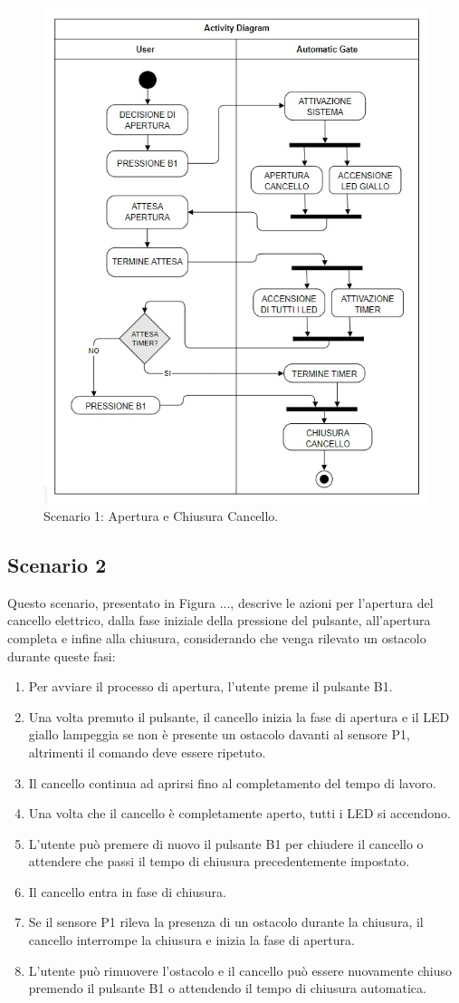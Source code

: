 \documentclass[12pt]{article}
\begin{document}
\begin{figure}[h]
    \centering
    \includegraphics[width = 0.7 \textwidth ]{Scenario_1.jpg}
    \caption{Scenario 1: Apertura e Chiusura Cancello.}
    
\end{figure}

\subsection{Scenario 2}
Questo scenario, presentato in Figura ..., descrive le azioni per l’apertura del cancello elettrico, dalla fase iniziale della pressione del pulsante, all’apertura completa e infine alla chiusura, considerando che venga rilevato un ostacolo durante queste fasi:
\begin{enumerate}
    \item Per avviare il processo di apertura, l’utente preme il pulsante B1.
    \item Una volta premuto il pulsante, il cancello inizia la fase di apertura e il LED giallo lampeggia se non è presente un ostacolo davanti al sensore P1, altrimenti il comando deve essere ripetuto.
    \item Il cancello continua ad aprirsi fino al completamento del tempo di lavoro.
    \item Una volta che il cancello è completamente aperto, tutti i LED si accendono.
    \item L'utente può premere di nuovo il pulsante B1 per chiudere il cancello o attendere che passi il tempo di chiusura precedentemente impostato.
    \item Il cancello entra in fase di chiusura.
    \item Se il sensore P1 rileva la presenza di un ostacolo durante la chiusura, il cancello interrompe la chiusura e inizia la fase di apertura.
    \item L’utente può rimuovere l’ostacolo e il cancello può essere nuovamente chiuso premendo il pulsante B1 o attendendo il tempo di chiusura automatica.
\end{enumerate}
\end{document}
